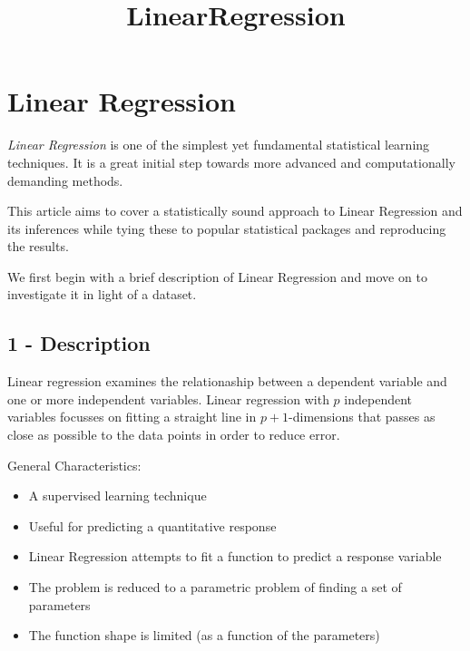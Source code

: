 \documentclass[11pt]{article}
\title{LinearRegression}
\providecommand{\tightlist}{%
      \setlength{\itemsep}{0pt}\setlength{\parskip}{0pt}}
\begin{document}
    
    
    \maketitle
    
    

    
    \hypertarget{linear-regression}{%
\section{Linear Regression}\label{linear-regression}}

\emph{Linear Regression} is one of the simplest yet fundamental
statistical learning techniques. It is a great initial step towards more
advanced and computationally demanding methods.

This article aims to cover a statistically sound approach to Linear
Regression and its inferences while tying these to popular statistical
packages and reproducing the results.

We first begin with a brief description of Linear Regression and move on
to investigate it in light of a dataset.

    \hypertarget{description}{%
\subsection{1 - Description}\label{description}}

Linear regression examines the relationaship between a dependent
variable and one or more independent variables. Linear regression with
\(p\) independent variables focusses on fitting a straight line in
\(p+1\)-dimensions that passes as close as possible to the data points
in order to reduce error.

General Characteristics:

\begin{itemize}
\tightlist
\item
  A supervised learning technique
\item
  Useful for predicting a quantitative response
\item
  Linear Regression attempts to fit a function to predict a response
  variable
\item
  The problem is reduced to a parametric problem of finding a set of
  parameters
\item
  The function shape is limited (as a function of the parameters)
\end{itemize}
\end{document}
